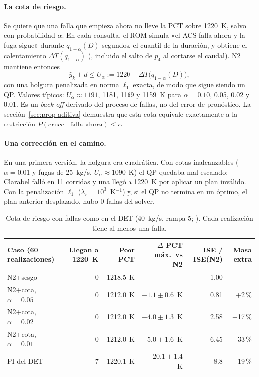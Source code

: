 \paragraph{La cota de riesgo.} Se quiere que una falla que empieza ahora no lleve la PCT sobre
1220~K, salvo con probabilidad $\alpha$. En cada consulta, el ROM simula «el ACS falla ahora y
la fuga sigue» durante $q_{1-\alpha}(D)$ segundos, el cuantil de la duración, y obtiene el
calentamiento $\Delta T(q_{1-\alpha})$ (, incluido el salto de $p_4$ al
cortarse el caudal). N2 mantiene entonces
\[
\hat y_k+d\le U_\alpha:=1220-\Delta T\big(q_{1-\alpha}(D)\big),
\]
con una holgura penalizada en norma $\ell_1$ exacta, de modo que sigue siendo un QP. Valores
típicos: $U_\alpha\approx1191$, 1181, 1169 y 1159~K para $\alpha=0.10$, 0.05, 0.02 y 0.01. Es un
\emph{back-off} derivado del proceso de fallas, no del error de pronóstico. La
sección~\ref{sec:prop-aditiva} demuestra que esta cota equivale exactamente a la restricción
$P(\text{cruce}\mid\text{falla ahora})\le\alpha$.

\paragraph{Una corrección en el camino.} En una primera versión, la holgura era cuadrática.
Con cotas inalcanzables ($\alpha=0.01$ y fugas de 25~kg/s, $U_\alpha\approx1090$~K) el QP quedaba
mal escalado: Clarabel falló en 11 corridas y una llegó a 1220~K por aplicar un plan inválido.
Con la penalización $\ell_1$ ($\lambda_r=10^3$~K$^{-1}$) y, si el QP no termina en un óptimo, el
plan anterior desplazado, hubo 0 fallas del solver.

\begin{table}[H]\centering\footnotesize\setlength{\tabcolsep}{4pt}
\begin{tabularx}{\linewidth}{@{}Y r r r r r@{}}\toprule
Caso (60 realizaciones) & Llegan a 1220~K & Peor PCT & $\Delta$ PCT máx.\ vs N2 & ISE / ISE(N2) & Masa extra\\\midrule
N2+sesgo & 0 & 1218.5~K & --- & 1.00 & ---\\
N2+cota, $\alpha=0.05$ & 0 & 1212.0~K & $-1.1\pm0.6$~K & 0.81 & +2\,\%\\
N2+cota, $\alpha=0.02$ & 0 & 1212.0~K & $-4.0\pm1.3$~K & 2.58 & +17\,\%\\
N2+cota, $\alpha=0.01$ & 0 & 1212.0~K & $-5.0\pm1.6$~K & 6.45 & +33\,\%\\
PI del DET & 7 & 1220.1~K & $+20.1\pm1.4$~K & 8.8 & +19\,\%\\\bottomrule
\end{tabularx}
\caption{Cota de riesgo con fallas como en el DET (40~kg/s, rampa 5; ).
Cada realización tiene al menos una falla.}
\end{table}

